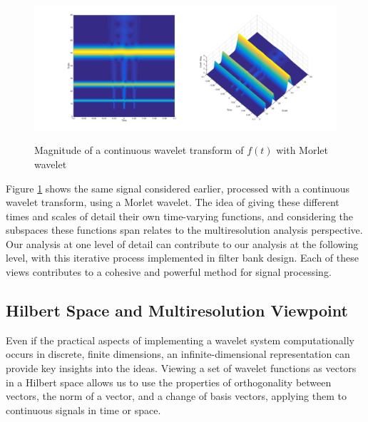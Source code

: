 \documentclass[letterpaper]{article}
\begin{document}
\begin{figure}[h]
  \caption{Magnitude of a continuous wavelet transform of \(f(t)\) with Morlet wavelet}
  \centering
    \includegraphics[width=1\textwidth]{figures/waveletclicks}
  \label{fig:waveletclicks}
\end{figure}

Figure \ref{fig:waveletclicks} shows the same signal considered earlier,
processed with a continuous wavelet transform, using a Morlet wavelet.
The idea of giving these different times and scales of detail their own time-varying functions,
and considering the subspaces these functions span relates to the multiresolution analysis perspective.
Our analysis at one level of detail can contribute to our analysis at the following level,
with this iterative process implemented in filter bank design.
Each of these views contributes to a cohesive and powerful method for signal processing. 


\subsection{Hilbert Space and Multiresolution Viewpoint}
Even if the practical aspects of implementing a wavelet system computationally occurs in discrete, finite dimensions,
an infinite-dimensional representation can provide key insights into the ideas.
Viewing a set of wavelet functions as vectors in a Hilbert space allows us to use the properties of orthogonality between vectors,
the norm of a vector, and a change of basis vectors, applying them to continuous signals in time or space.
\end{document}
